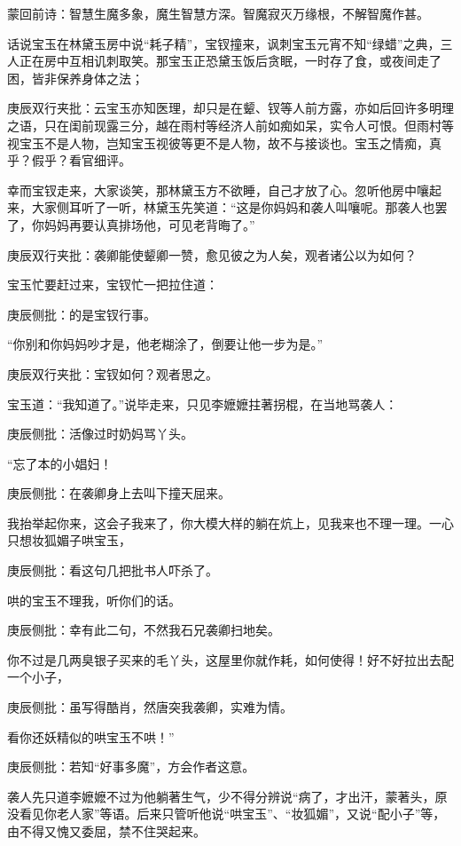 
\begin{parag}
    \begin{note}蒙回前诗：智慧生魔多象，魔生智慧方深。智魔寂灭万缘根，不解智魔作甚。\end{note}
\end{parag}


\begin{parag}
    话说宝玉在林黛玉房中说“耗子精”，宝钗撞来，讽刺宝玉元宵不知“绿蜡”之典，三人正在房中互相讥刺取笑。那宝玉正恐黛玉饭后贪眠，一时存了食，或夜间走了困，皆非保养身体之法；\begin{note}庚辰双行夹批：云宝玉亦知医理，却只是在颦、钗等人前方露，亦如后回许多明理之语，只在闺前现露三分，越在雨村等经济人前如痴如呆，实令人可恨。但雨村等视宝玉不是人物，岂知宝玉视彼等更不是人物，故不与接谈也。宝玉之情痴，真乎？假乎？看官细评。\end{note}幸而宝钗走来，大家谈笑，那林黛玉方不欲睡，自己才放了心。忽听他房中嚷起来，大家侧耳听了一听，林黛玉先笑道：“这是你妈妈和袭人叫嚷呢。那袭人也罢了，你妈妈再要认真排场他，可见老背晦了。”\begin{note}庚辰双行夹批：袭卿能使颦卿一赞，愈见彼之为人矣，观者诸公以为如何？\end{note}
\end{parag}


\begin{parag}
    宝玉忙要赶过来，宝钗忙一把拉住道：\begin{note}庚辰侧批：的是宝钗行事。\end{note}“你别和你妈妈吵才是，他老糊涂了，倒要让他一步为是。”\begin{note}庚辰双行夹批：宝钗如何？观者思之。\end{note}宝玉道：“我知道了。”说毕走来，只见李嬷嬷拄著拐棍，在当地骂袭人：\begin{note}庚辰侧批：活像过时奶妈骂丫头。\end{note}“忘了本的小娼妇！\begin{note}庚辰侧批：在袭卿身上去叫下撞天屈来。\end{note}我抬举起你来，这会子我来了，你大模大样的躺在炕上，见我来也不理一理。一心只想妆狐媚子哄宝玉，\begin{note}庚辰侧批：看这句几把批书人吓杀了。\end{note}哄的宝玉不理我，听你们的话。\begin{note}庚辰侧批：幸有此二句，不然我石兄袭卿扫地矣。\end{note}你不过是几两臭银子买来的毛丫头，这屋里你就作耗，如何使得！好不好拉出去配一个小子，\begin{note}庚辰侧批：虽写得酷肖，然唐突我袭卿，实难为情。\end{note}看你还妖精似的哄宝玉不哄！”\begin{note}庚辰侧批：若知“好事多魔”，方会作者这意。\end{note}袭人先只道李嬷嬷不过为他躺著生气，少不得分辨说“病了，才出汗，蒙著头，原没看见你老人家”等语。后来只管听他说“哄宝玉”、“妆狐媚”，又说“配小子”等，由不得又愧又委屈，禁不住哭起来。
\end{parag}


